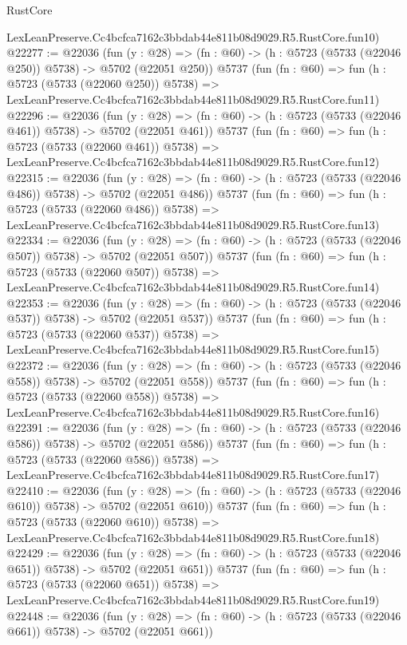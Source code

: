 \begin{lexlean}{RustCore}
\begin{coremodule}
    LexLeanPreserve.Cc4bcfca7162c3bbdab44e811b08d9029.R5.RustCore.fun10)
@22277 := @22036
    (fun (y : @28) => (fn : @60) -> (h : @5723 (@5733 (@22046 @250)) @5738) -> @5702 (@22051 @250))
    @5737
    (fun (fn : @60) =>
    fun (h : @5723 (@5733 (@22060 @250)) @5738) =>
    LexLeanPreserve.Cc4bcfca7162c3bbdab44e811b08d9029.R5.RustCore.fun11)
@22296 := @22036
    (fun (y : @28) => (fn : @60) -> (h : @5723 (@5733 (@22046 @461)) @5738) -> @5702 (@22051 @461))
    @5737
    (fun (fn : @60) =>
    fun (h : @5723 (@5733 (@22060 @461)) @5738) =>
    LexLeanPreserve.Cc4bcfca7162c3bbdab44e811b08d9029.R5.RustCore.fun12)
@22315 := @22036
    (fun (y : @28) => (fn : @60) -> (h : @5723 (@5733 (@22046 @486)) @5738) -> @5702 (@22051 @486))
    @5737
    (fun (fn : @60) =>
    fun (h : @5723 (@5733 (@22060 @486)) @5738) =>
    LexLeanPreserve.Cc4bcfca7162c3bbdab44e811b08d9029.R5.RustCore.fun13)
@22334 := @22036
    (fun (y : @28) => (fn : @60) -> (h : @5723 (@5733 (@22046 @507)) @5738) -> @5702 (@22051 @507))
    @5737
    (fun (fn : @60) =>
    fun (h : @5723 (@5733 (@22060 @507)) @5738) =>
    LexLeanPreserve.Cc4bcfca7162c3bbdab44e811b08d9029.R5.RustCore.fun14)
@22353 := @22036
    (fun (y : @28) => (fn : @60) -> (h : @5723 (@5733 (@22046 @537)) @5738) -> @5702 (@22051 @537))
    @5737
    (fun (fn : @60) =>
    fun (h : @5723 (@5733 (@22060 @537)) @5738) =>
    LexLeanPreserve.Cc4bcfca7162c3bbdab44e811b08d9029.R5.RustCore.fun15)
@22372 := @22036
    (fun (y : @28) => (fn : @60) -> (h : @5723 (@5733 (@22046 @558)) @5738) -> @5702 (@22051 @558))
    @5737
    (fun (fn : @60) =>
    fun (h : @5723 (@5733 (@22060 @558)) @5738) =>
    LexLeanPreserve.Cc4bcfca7162c3bbdab44e811b08d9029.R5.RustCore.fun16)
@22391 := @22036
    (fun (y : @28) => (fn : @60) -> (h : @5723 (@5733 (@22046 @586)) @5738) -> @5702 (@22051 @586))
    @5737
    (fun (fn : @60) =>
    fun (h : @5723 (@5733 (@22060 @586)) @5738) =>
    LexLeanPreserve.Cc4bcfca7162c3bbdab44e811b08d9029.R5.RustCore.fun17)
@22410 := @22036
    (fun (y : @28) => (fn : @60) -> (h : @5723 (@5733 (@22046 @610)) @5738) -> @5702 (@22051 @610))
    @5737
    (fun (fn : @60) =>
    fun (h : @5723 (@5733 (@22060 @610)) @5738) =>
    LexLeanPreserve.Cc4bcfca7162c3bbdab44e811b08d9029.R5.RustCore.fun18)
@22429 := @22036
    (fun (y : @28) => (fn : @60) -> (h : @5723 (@5733 (@22046 @651)) @5738) -> @5702 (@22051 @651))
    @5737
    (fun (fn : @60) =>
    fun (h : @5723 (@5733 (@22060 @651)) @5738) =>
    LexLeanPreserve.Cc4bcfca7162c3bbdab44e811b08d9029.R5.RustCore.fun19)
@22448 := @22036
    (fun (y : @28) => (fn : @60) -> (h : @5723 (@5733 (@22046 @661)) @5738) -> @5702 (@22051 @661))

\end{coremodule}
\end{lexlean}
